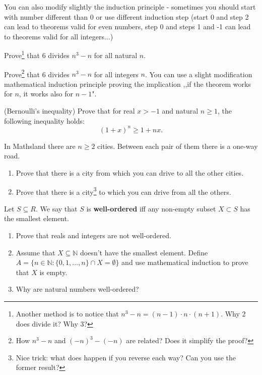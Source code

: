 \noindent You can also modify slightly the induction principle - sometimes you should start with number different than 0 or use different induction step
(start 0 and step 2 can lead to theorems valid for even numbers, step 0 and steps 1 and -1 can lead to theorems valid for all integers...) 
\begin{prob}
	\item Prove\footnote{Another method is to notice that $n^3-n=(n-1)\cdot n\cdot (n+1)$. Why 2 does divide it? Why 3?} that 6 divides 
		$n^3-n$ for all natural $n$.
	\item Prove\footnote{How $n^3-n$ and $(-n)^3-(-n)$ are related? Does it simplify the proof?} that 6 divides $n^3-n$ for all integers $n$. 
		You can use a slight modification mathematical induction principle proving the implication 
		,,if the theorem works for $n$, it works also for $n-1$".  
\end{prob}

\begin{prob}
	(Bernoulli's inequality) Prove that for real $x > -1$ and natural $n\ge 1$, the following inequality holds:
	$$(1+x)^n\ge 1+nx.$$
\end{prob}

\begin{prob}
	In Mathsland there are $n\ge 2$ cities. Between each pair of them there is a one-way road. 
	\begin{enumerate}
		\item Prove that there is a city from which you can drive to all the other cities.
		\item Prove that there is a city\footnote{Nice trick: what does happen if you reverse each way? Can you use the former result?} 
			to which you can drive from all the others.
	\end{enumerate}
\end{prob}

\begin{prob}
	Let $S\subseteq R$. We say that $S$ is \textbf{well-ordered} iff any non-empty subset $X\subset S$ has the smallest element.
	\begin{enumerate}
		\item Prove that reals and integers are not well-ordered.
		\item Assume that $X\subseteq \mathbb N$ doesn't have the smallest element. Define $A=\{n\in \mathbb N : \{0,1,\dots,n\}\cap X=\emptyset\}$
			and use mathematical induction to prove that $X$ is empty.
		\item Why are natural numbers well-ordered? 
	\end{enumerate}
\end{prob}

